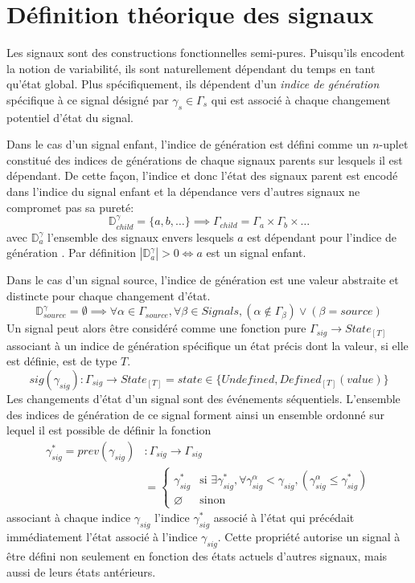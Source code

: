 \chapter{Définition théorique des signaux}
	
Les signaux sont des constructions fonctionnelles semi-pures. Puisqu'ils encodent la notion de variabilité, ils sont naturellement dépendant du temps en tant qu'état global. Plus spécifiquement, ils dépendent d'un \emph{indice de génération} spécifique à ce signal désigné par $\gamma_s \in \Gamma_s$ qui est associé à chaque changement potentiel d'état du signal.

Dans le cas d'un signal enfant, l'indice de génération est défini comme un $n$-uplet constitué des indices de générations de chaque signaux parents sur lesquels il est dépendant. De cette façon, l'indice et donc l'état des signaux parent est encodé dans l'indice du signal enfant et la dépendance vers d'autres signaux ne compromet pas sa pureté:
\[
	\mathbb{D}^\gamma_{child} = \{ a, b, \dots \} \implies \Gamma_{child} = \Gamma_a \times \Gamma_b \times \dots
\]
avec $\mathbb{D}^\gamma_{a}$ l'ensemble des signaux envers lesquels $a$ est dépendant pour l'indice de génération \gamma. Par définition $|\mathbb{D}^\gamma_{a}| > 0 \iff a$ est un signal enfant.

Dans le cas d'un signal source, l'indice de génération est une valeur abstraite et distincte pour chaque changement d'état.
\[
	\mathbb{D}^\gamma_{source} = \emptyset \implies \forall \alpha \in \Gamma_{source}, \forall \beta \in Signals, (\alpha \notin \Gamma_\beta) \lor (\beta = source)
\]
Un signal peut alors être considéré comme une fonction pure $\Gamma_{sig} \to State_{[T]}$ associant à un indice de génération spécifique un état précis dont la valeur, si elle est définie, est de type $T$.
\[
	sig(\gamma_{sig})\colon \Gamma_{sig} \to State_{[T]} = state \in \{ Undefined, Defined_{[T]}(value) \}
\]
Les changements d'état d'un signal sont des événements séquentiels. L'ensemble des indices de génération de ce signal forment ainsi un ensemble ordonné sur lequel il est possible de définir la fonction
\begin{align*}
	\gamma^*_{sig} = prev(\gamma_{sig}) &\colon \Gamma_{sig} \to \Gamma_{sig}\\
	& = \begin{cases}
		\gamma^*_{sig} & \text{si }
		 \exists \gamma^*_{sig}, \forall \gamma^\alpha_{sig} < \gamma_{sig}, (\gamma^\alpha_{sig} \leq \gamma^*_{sig})\\
		\varnothing & \text{sinon}
	\end{cases}
\end{align*}
associant à chaque indice $\gamma_{sig}$ l'indice $\gamma^*_{sig}$ associé à l'état qui précédait immédiatement l'état associé à l'indice $\gamma_{sig}$. Cette propriété autorise un signal à être défini non seulement en fonction des états actuels d'autres signaux, mais aussi de leurs états antérieurs.

